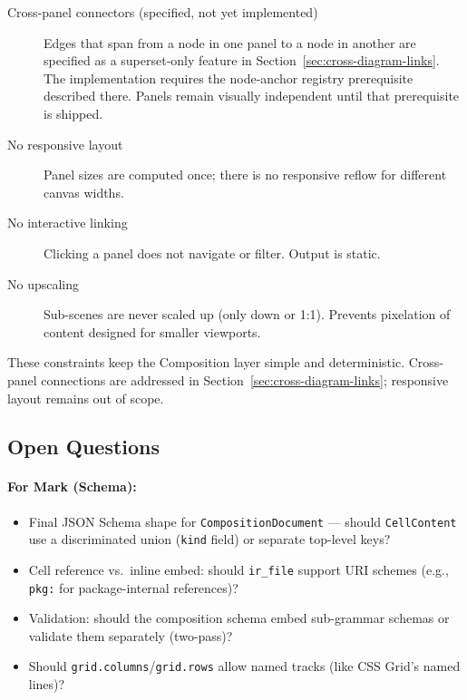 \begin{description}
  \item[Cross-panel connectors (specified, not yet implemented)]
        Edges that span from a node in one panel to a node in another are
        specified as a superset-only feature in
        Section~\ref{sec:cross-diagram-links}.  The implementation requires the
        node-anchor registry prerequisite described there.  Panels remain
        visually independent until that prerequisite is shipped.

  \item[No responsive layout] Panel sizes are computed once; there is no responsive reflow for different canvas widths.
  
  \item[No interactive linking] Clicking a panel does not navigate or filter. Output is static.
  
  \item[No upscaling] Sub-scenes are never scaled up (only down or 1:1). Prevents pixelation of content designed for smaller viewports.
\end{description}

These constraints keep the Composition layer simple and deterministic.  Cross-panel
connections are addressed in Section~\ref{sec:cross-diagram-links}; responsive layout
remains out of scope.

\subsection{Open Questions}
\label{sec:composition-open-questions}

\paragraph{For Mark (Schema):}
\begin{itemize}
  \item Final JSON Schema shape for \texttt{CompositionDocument} --- should \texttt{CellContent} use a discriminated union (\texttt{kind} field) or separate top-level keys?
  \item Cell reference vs.\ inline embed: should \texttt{ir\_file} support URI schemes (e.g., \texttt{pkg:} for package-internal references)?
  \item Validation: should the composition schema embed sub-grammar schemas or validate them separately (two-pass)?
  \item Should \texttt{grid.columns}/\texttt{grid.rows} allow named tracks (like CSS Grid's named lines)?
\end{itemize}

